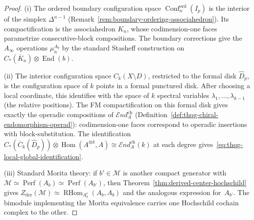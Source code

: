 \begin{proof}
(i) The ordered boundary configuration space
$\operatorname{Conf}^{\mathrm{ord}}_n(I_p)$ is the interior of
the simplex $\Delta^{n-1}$
(Remark~\ref{rem:boundary-ordering-associahedron}).
Its compactification is the associahedron $K_n$, whose
codimension-one faces parametrize consecutive-block compositions.
The boundary corrections give the $A_\infty$ operations $\mu_n^{A_b}$
by the standard Stasheff construction on
$C_*(\overline{K}_n) \otimes \operatorname{End}(b)$.

(ii) The interior configuration space $C_k(X \setminus D)$,
restricted to the formal disk $\widehat{D}_p$, is the
configuration space of $k$ points in a formal punctured disk.
After choosing a local coordinate, this identifies with the
space of $k$ spectral variables $\lambda_1, \ldots, \lambda_{k-1}$
(the relative positions). The FM compactification on this formal
disk gives exactly the operadic compositions of
$\mathcal{E}\!nd^{\mathrm{ch}}_A$
(Definition~\ref{def:thqg-chiral-endomorphism-operad}):
codimension-one faces correspond to operadic insertions with
block-substitution. The identification
$C_*(\overline{C}_k(\widehat{D}_p))
\otimes \operatorname{Hom}(A^{\otimes k}, A)
\cong \mathcal{E}\!nd^{\mathrm{ch}}_A(k)$
at each degree gives~\eqref{eq:thqg-local-global-identification}.

(iii) Standard Morita theory: if $b' \in \mathcal{M}$ is
another compact generator with
$\mathcal{M} \simeq \operatorname{Perf}(A_b)
\simeq \operatorname{Perf}(A_{b'})$,
then Theorem~\ref{thm:derived-center-hochschild} gives
$Z_{\mathrm{der}}(\mathcal M)\simeq \operatorname{RHom}_{A_b^e}(A_b,A_b)$
and the analogous expression for~$A_{b'}$. The bimodule
implementing the Morita equivalence carries one Hochschild
cochain complex to the other.
\end{proof}

